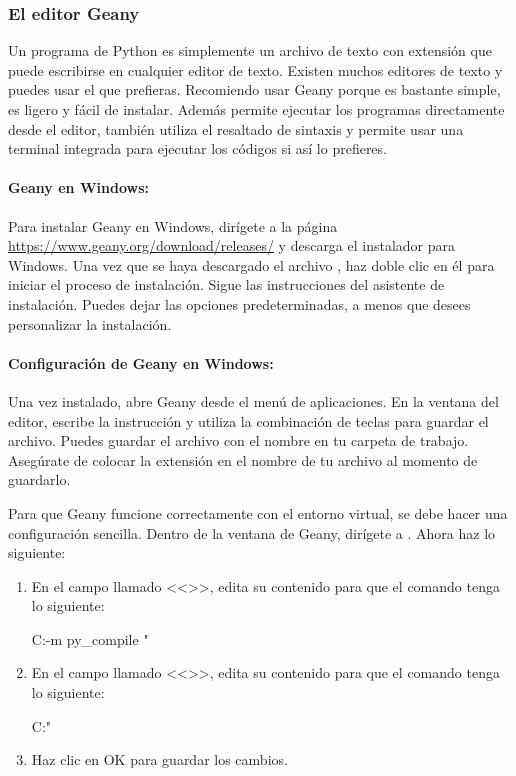 \subsubsection{El editor Geany}
Un programa de Python es simplemente un archivo de texto con extensión  que puede escribirse en cualquier editor de texto. 
Existen muchos editores de texto y puedes usar el que prefieras. Recomiendo usar Geany porque es bastante simple, es ligero y fácil de instalar. Además permite ejecutar los programas directamente desde el editor, también utiliza el resaltado de sintaxis y permite usar una terminal integrada para ejecutar los códigos si así lo prefieres. 

\paragraph{Geany en Windows:}
Para instalar Geany en Windows, dirígete a la página \url{https://www.geany.org/download/releases/} y descarga el instalador para Windows. Una vez que se haya descargado el archivo , haz doble clic en él para iniciar el proceso de instalación. Sigue las instrucciones del asistente de instalación. Puedes dejar las opciones predeterminadas, a menos que desees personalizar la instalación.


\paragraph{Configuración de Geany en Windows:}
Una vez instalado, abre Geany desde el menú de aplicaciones. En la ventana del editor, escribe la instrucción  y utiliza la combinación de teclas  para guardar el archivo. Puedes guardar el archivo con el nombre  en tu carpeta de trabajo. Asegúrate de colocar la extensión  en el nombre de tu archivo al momento de guardarlo. 

Para que Geany funcione correctamente con el entorno virtual, se debe hacer una configuración sencilla. Dentro de la ventana de Geany, dirígete a . Ahora haz lo siguiente:
\begin{enumerate}
    \item En el campo llamado <<>>, edita su contenido para que el comando tenga lo siguiente: 
    \begin{shell}
    C:\Users\user\omm\Scripts\python -m py_compile "%
    \end{shell}

    \item En el campo llamado <<>>, edita su contenido para que el comando tenga lo siguiente: 
    \begin{shell}
    C:\Users\user\omm\Scripts\python "%
    \end{shell}

    \item Haz clic en OK para guardar los cambios.
\end{enumerate}


